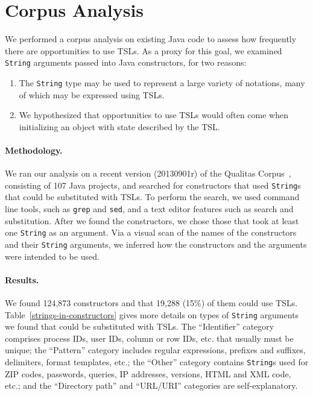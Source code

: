 
\section{Corpus Analysis}
\label{s:study}

We performed a corpus analysis on existing Java code to assess how frequently there are opportunities to use TSLs. As a proxy for this goal, we examined \lstinline{String} arguments passed into Java constructors, for two reasons:

\begin{enumerate}
\item The \lstinline{String} type may be used to represent a large variety of notations, many of which may be expressed using TSLs.
\item We hypothesized that opportunities to use TSLs would often come when initializing an object with state described by the TSL.
\end{enumerate}

\paragraph{Methodology.} We ran our analysis on a recent version (20130901r) of the Qualitas Corpus~\cite{QualitasCorpus:APSEC:2010}, consisting of 107 Java projects, and searched for constructors that used \lstinline{String}s that could be substituted with TSLs. To perform the search, we used command line tools, such as \lstinline{grep} and \lstinline{sed}, and a text editor features such as search and substitution. After we found the constructors, we chose those that took at least one \lstinline{String} as an argument. Via a visual scan of the names of the constructors and their \lstinline{String} arguments, we inferred how the constructors and the arguments were intended to be used.


\paragraph{Results.} We found 124,873 constructors and that 19,288 (15\%) of them could use TSLs. Table~\ref{strings-in-constructors} gives more details on types of \lstinline{String} arguments we found that could be substituted with TSLs. The ``Identifier'' category comprises process IDs, user IDs, column or row IDs, etc. that usually must be unique; the ``Pattern'' category includes regular expressions, prefixes and suffixes, delimiters, format templates, etc.; the ``Other'' category contains \lstinline{String}s used for ZIP codes, passwords, queries, IP addresses, versions, HTML and XML code, etc.; and the ``Directory path'' and ``URL/URI'' categories are self-explanatory.

